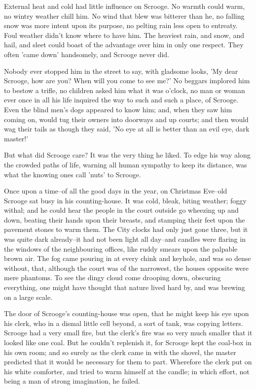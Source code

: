 External heat and cold had little influence on Scrooge. No warmth could
warm, no wintry weather chill him. No wind that blew was bitterer than
he, no falling snow was more intent upon its purpose, no pelting rain
less open to entreaty. Foul weather didn't know where to have him. The
heaviest rain, and snow, and hail, and sleet could boast of the
advantage over him in only one respect. They often 'came down'
handsomely, and Scrooge never did.

Nobody ever stopped him in the street to say, with gladsome looks, 'My
dear Scrooge, how are you? When will you come to see me?' No beggars
implored him to bestow a trifle, no children asked him what it was
o'clock, no man or woman ever once in all his life inquired the way to
such and such a place, of Scrooge. Even the blind men's dogs appeared to
know him; and, when they saw him coming on, would tug their owners into
doorways and up courts; and then would wag their tails as though they
said, 'No eye at all is better than an evil eye, dark master!'

But what did Scrooge care? It was the very thing he liked. To edge his
way along the crowded paths of life, warning all human sympathy to keep
its distance, was what the knowing ones call 'nuts' to Scrooge.

Once upon a time--of all the good days in the year, on Christmas
Eve--old Scrooge sat busy in his counting-house. It was cold, bleak,
biting weather; foggy withal; and he could hear the people in the court
outside go wheezing up and down, beating their hands upon their breasts,
and stamping their feet upon the pavement stones to warm them. The City
clocks had only just gone three, but it was quite dark already--it had
not been light all day--and candles were flaring in the windows of the
neighbouring offices, like ruddy smears upon the palpable brown air. The
fog came pouring in at every chink and keyhole, and was so dense
without, that, although the court was of the narrowest, the houses
opposite were mere phantoms. To see the dingy cloud come drooping down,
obscuring everything, one might have thought that nature lived hard by,
and was brewing on a large scale.

The door of Scrooge's counting-house was open, that he might keep his
eye upon his clerk, who in a dismal little cell beyond, a sort of tank,
was copying letters. Scrooge had a very small fire, but the clerk's fire
was so very much smaller that it looked like one coal. But he couldn't
replenish it, for Scrooge kept the coal-box in his own room; and so
surely as the clerk came in with the shovel, the master predicted that
it would be necessary for them to part. Wherefore the clerk put on his
white comforter, and tried to warm himself at the candle; in which
effort, not being a man of strong imagination, he failed.

